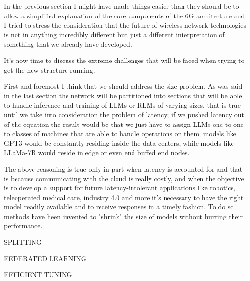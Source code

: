 

In the previous section I might have made things easier than they should be to allow a simplified
explanation of the core components of the 6G architecture and I tried to stress the consideration
that the future of wireless network technologies is not in anything incredibly different but just a
different interpretation of something that we already have developed.

It's now time to discuss the extreme challenges that will be faced when trying to get the new
structure running.

First and foremost I think that we should address the size problem.
As was said in the last section the network will be partitioned into sections that will be able to
handle inference and training of LLMs or RLMs of varying sizes, that is true until we take into
consideration the problem of latency; if we pushed latency out of the equation the result would be
that we just have to assign LLMs one to one to classes of machines that are able to handle
operations on them, models like GPT3 would be constantly residing inside the data-centers, while
models like LLaMa-7B would reside in edge or even end buffed end nodes.

The above reasoning is true only in part when latency is accounted for and that is because
communicating with the cloud is really costly, and when the objective is to develop a support for
future latency-intolerant applications like robotics, teleoperated medical care, industry 4.0 and
more it's necessary to have the right model readily available and to receive responses in a timely
fashion. To do so methods have been invented to "shrink" the size of models without hurting their
performance.

SPLITTING

FEDERATED LEARNING

EFFICIENT TUNING
